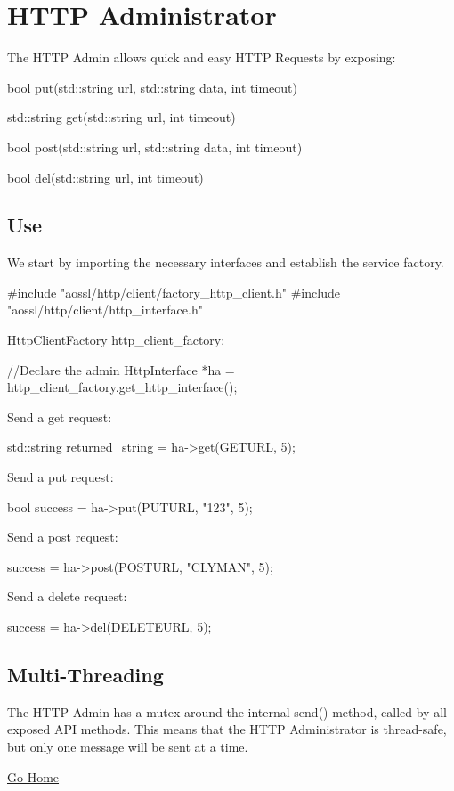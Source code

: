 \section*{H\+T\+TP Administrator}

The H\+T\+TP Admin allows quick and easy H\+T\+TP Requests by exposing\+:


\begin{DoxyItemize}
\item bool put(std\+::string url, std\+::string data, int timeout)
\item std\+::string get(std\+::string url, int timeout)
\item bool post(std\+::string url, std\+::string data, int timeout)
\item bool del(std\+::string url, int timeout)
\end{DoxyItemize}

\subsection*{Use}

We start by importing the necessary interfaces and establish the service factory. \begin{DoxyVerb}#include "aossl/http/client/factory_http_client.h"
#include "aossl/http/client/http_interface.h"

HttpClientFactory http_client_factory;

//Declare the admin
HttpInterface *ha = http_client_factory.get_http_interface();
\end{DoxyVerb}


Send a get request\+: \begin{DoxyVerb}std::string returned_string = ha->get(GETURL, 5);
\end{DoxyVerb}


Send a put request\+: \begin{DoxyVerb}bool success = ha->put(PUTURL, "123", 5);
\end{DoxyVerb}


Send a post request\+: \begin{DoxyVerb}success = ha->post(POSTURL, "CLYMAN", 5);
\end{DoxyVerb}


Send a delete request\+: \begin{DoxyVerb}success = ha->del(DELETEURL, 5);
\end{DoxyVerb}


\subsection*{Multi-\/\+Threading}

The H\+T\+TP Admin has a mutex around the internal send() method, called by all exposed A\+PI methods. This means that the H\+T\+TP Administrator is thread-\/safe, but only one message will be sent at a time.

\hyperlink{index}{Go Home} 